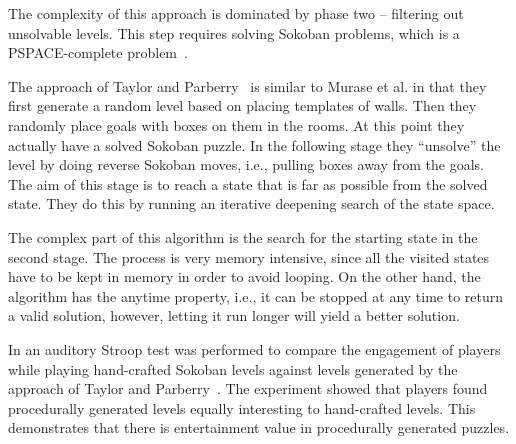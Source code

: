 \documentclass[runningheads]{llncs}
\begin{document}
The complexity of this approach is dominated by phase two -- filtering out unsolvable levels. This
step requires solving Sokoban problems, which is a PSPACE-complete problem~\cite{culberson1997sokoban}.

The approach of Taylor and Parberry~\cite{taylor2011procedural} is similar to Murase et al.
in that they first generate a random level based on placing templates of walls. Then they
randomly place goals with boxes on them in the rooms. At this point they 
actually have a solved Sokoban
puzzle. In the following stage they ``unsolve'' the level by doing reverse Sokoban moves, i.e., 
pulling boxes away from the goals. The aim of this stage is to reach a state that is far as 
possible from the solved state. They do this by running an iterative deepening search of the
state space.

The complex part of this algorithm is the search for the starting state in the second stage. 
The process is very memory intensive, since all the visited states have to be kept in 
memory in order to avoid looping. On the other hand, the algorithm has the anytime property, i.e., it 
can be stopped at any time to return a valid solution, however, letting it run longer will yield
a better solution.

In \cite{taylor2015attention} an auditory Stroop test was performed to compare the engagement of
players while playing hand-crafted Sokoban levels against levels generated by the approach of 
Taylor and Parberry~\cite{taylor2011procedural}. The experiment showed that players found
procedurally generated levels equally interesting to hand-crafted levels. This demonstrates
that there is entertainment value in procedurally generated puzzles.
\end{document}
